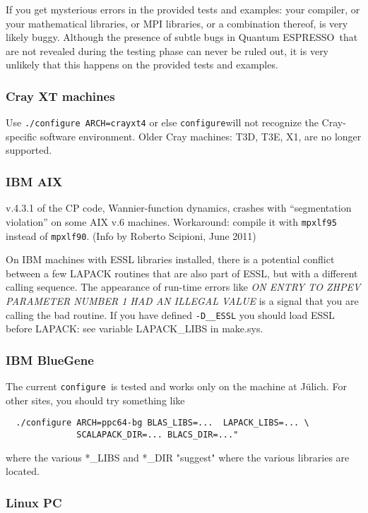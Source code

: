 \documentclass[12pt,a4paper]{article}
\def\qe{{\sc Quantum ESPRESSO}}
\def\configure{\texttt{configure}}
\begin{document}
If you get mysterious errors in the provided tests and examples:
your compiler, or your mathematical libraries, or MPI libraries,
or a combination thereof, is very likely buggy. Although the 
presence of subtle bugs in \qe\ that are not revealed during 
the testing phase can never be ruled out, it is very unlikely
that this happens on the provided tests and examples. 

\subsubsection{Cray XT machines}

Use \texttt{./configure ARCH=crayxt4} or else \configure will
not recognize the Cray-specific software environment. Older Cray 
machines: T3D, T3E, X1, are no longer supported.

\subsubsection{IBM AIX}

v.4.3.1 of the CP code, Wannier-function dynamics, crashes with
``segmentation violation'' on some AIX v.6 machines.
Workaround: compile it with \texttt{mpxlf95} instead of 
\texttt{mpxlf90}. (Info by Roberto Scipioni, June 2011)

On IBM machines with ESSL libraries installed, there is a 
potential conflict between a few LAPACK routines that are also part of ESSL, 
but with a different calling sequence. The appearance of run-time errors like {\em
    ON ENTRY TO ZHPEV  PARAMETER NUMBER  1 HAD AN ILLEGAL VALUE}
is a signal that you are calling the bad routine. If you have defined 
\texttt{-D\_\_ESSL} you should load ESSL before LAPACK: see
variable LAPACK\_LIBS in make.sys.

\subsubsection{IBM BlueGene}

The current \configure\ is tested and works only on the machine at
J\"ulich. For other sites, you should try something like
\begin{verbatim}
  ./configure ARCH=ppc64-bg BLAS_LIBS=...  LAPACK_LIBS=... \
              SCALAPACK_DIR=... BLACS_DIR=..."
\end{verbatim}
where the various *\_LIBS and *\_DIR "suggest" where the various libraries 
are located.

\subsubsection{Linux PC}
\end{document}
